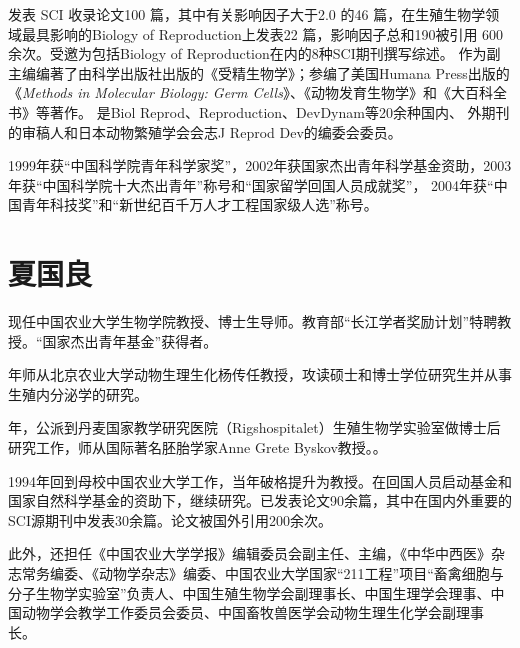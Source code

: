 发表 SCI 收录论文100 篇，其中有关影响因子大于2.0 的46 篇，在生殖生物学领域最具影响的Biology of Reproduction上发表22 篇，影响因子总和190被引用 600 余次。受邀为包括Biology of Reproduction在内的8种SCI期刊撰写综述。 作为副主编编著了由科学出版社出版的《受精生物学》；参编了美国Humana Press出版的《\textit{Methods in Molecular Biology: Germ Cells}》、《动物发育生物学》和《大百科全书》等著作。 是Biol Reprod、Reproduction、DevDynam等20余种国内、 外期刊的审稿人和日本动物繁殖学会会志J Reprod Dev的编委会委员。

1999年获“中国科学院青年科学家奖”，2002年获国家杰出青年科学基金资助，2003 年获“中国科学院十大杰出青年”称号和“国家留学回国人员成就奖”， 2004年获“中国青年科技奖”和“新世纪百千万人才工程国家级人选”称号。

\section{夏国良}

现任中国农业大学生物学院教授、博士生导师。教育部“长江学者奖励计划”特聘教授。“国家杰出青年基金”获得者。

年师从北京农业大学动物生理生化杨传任教授，攻读硕士和博士学位研究生并从事生殖内分泌学的研究。

年，公派到丹麦国家教学研究医院（Rigshospitalet）生殖生物学实验室做博士后研究工作，师从国际著名胚胎学家Anne Grete Byskov教授。。

1994年回到母校中国农业大学工作，当年破格提升为教授。在回国人员启动基金和国家自然科学基金的资助下，继续研究。已发表论文90余篇，其中在国内外重要的SCI源期刊中发表30余篇。论文被国外引用200余次。

此外，还担任《中国农业大学学报》编辑委员会副主任、主编，《中华中西医》杂志常务编委、《动物学杂志》编委、中国农业大学国家“211工程”项目“畜禽细胞与分子生物学实验室”负责人、中国生殖生物学会副理事长、中国生理学会理事、中国动物学会教学工作委员会委员、中国畜牧兽医学会动物生理生化学会副理事
长。

